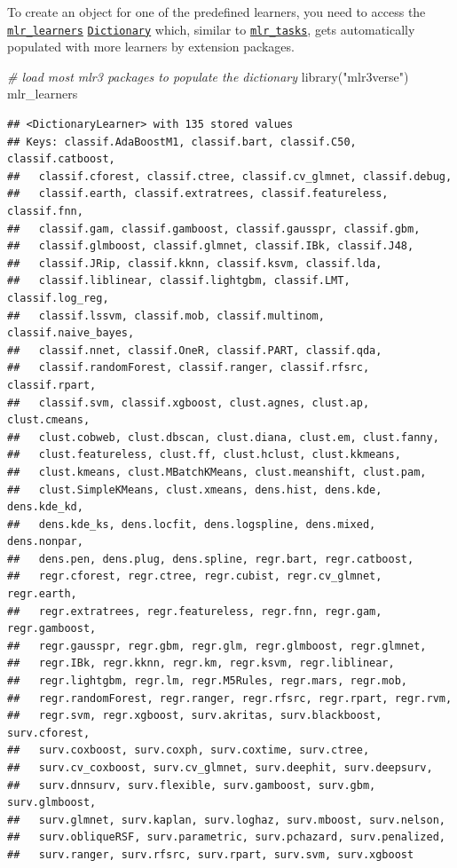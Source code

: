 \documentclass[
]{scrbook}
\newenvironment{Shaded}{\begin{snugshade}}{\end{snugshade}}
\newcommand{\CommentTok}[1]{\textcolor[rgb]{0.56,0.35,0.01}{\textit{#1}}}
\newcommand{\FunctionTok}[1]{\textcolor[rgb]{0.00,0.00,0.00}{#1}}
\newcommand{\NormalTok}[1]{#1}
\newcommand{\StringTok}[1]{\textcolor[rgb]{0.31,0.60,0.02}{#1}}
\renewenvironment{Shaded} {\begin{snugshade}\small} {\end{snugshade}}
\begin{document}
To create an object for one of the predefined learners, you need to access the \href{https://mlr3.mlr-org.com/reference/mlr_learners.html}{\texttt{mlr\_learners}} \href{https://mlr3misc.mlr-org.com/reference/Dictionary.html}{\texttt{Dictionary}} which, similar to \href{https://mlr3.mlr-org.com/reference/mlr_tasks.html}{\texttt{mlr\_tasks}}, gets automatically populated with more learners by extension packages.

\begin{Shaded}
\begin{Highlighting}[]
\CommentTok{\# load most mlr3 packages to populate the dictionary}
\FunctionTok{library}\NormalTok{(}\StringTok{"mlr3verse"}\NormalTok{)}
\NormalTok{mlr\_learners}
\end{Highlighting}
\end{Shaded}

\begin{verbatim}
## <DictionaryLearner> with 135 stored values
## Keys: classif.AdaBoostM1, classif.bart, classif.C50, classif.catboost,
##   classif.cforest, classif.ctree, classif.cv_glmnet, classif.debug,
##   classif.earth, classif.extratrees, classif.featureless, classif.fnn,
##   classif.gam, classif.gamboost, classif.gausspr, classif.gbm,
##   classif.glmboost, classif.glmnet, classif.IBk, classif.J48,
##   classif.JRip, classif.kknn, classif.ksvm, classif.lda,
##   classif.liblinear, classif.lightgbm, classif.LMT, classif.log_reg,
##   classif.lssvm, classif.mob, classif.multinom, classif.naive_bayes,
##   classif.nnet, classif.OneR, classif.PART, classif.qda,
##   classif.randomForest, classif.ranger, classif.rfsrc, classif.rpart,
##   classif.svm, classif.xgboost, clust.agnes, clust.ap, clust.cmeans,
##   clust.cobweb, clust.dbscan, clust.diana, clust.em, clust.fanny,
##   clust.featureless, clust.ff, clust.hclust, clust.kkmeans,
##   clust.kmeans, clust.MBatchKMeans, clust.meanshift, clust.pam,
##   clust.SimpleKMeans, clust.xmeans, dens.hist, dens.kde, dens.kde_kd,
##   dens.kde_ks, dens.locfit, dens.logspline, dens.mixed, dens.nonpar,
##   dens.pen, dens.plug, dens.spline, regr.bart, regr.catboost,
##   regr.cforest, regr.ctree, regr.cubist, regr.cv_glmnet, regr.earth,
##   regr.extratrees, regr.featureless, regr.fnn, regr.gam, regr.gamboost,
##   regr.gausspr, regr.gbm, regr.glm, regr.glmboost, regr.glmnet,
##   regr.IBk, regr.kknn, regr.km, regr.ksvm, regr.liblinear,
##   regr.lightgbm, regr.lm, regr.M5Rules, regr.mars, regr.mob,
##   regr.randomForest, regr.ranger, regr.rfsrc, regr.rpart, regr.rvm,
##   regr.svm, regr.xgboost, surv.akritas, surv.blackboost, surv.cforest,
##   surv.coxboost, surv.coxph, surv.coxtime, surv.ctree,
##   surv.cv_coxboost, surv.cv_glmnet, surv.deephit, surv.deepsurv,
##   surv.dnnsurv, surv.flexible, surv.gamboost, surv.gbm, surv.glmboost,
##   surv.glmnet, surv.kaplan, surv.loghaz, surv.mboost, surv.nelson,
##   surv.obliqueRSF, surv.parametric, surv.pchazard, surv.penalized,
##   surv.ranger, surv.rfsrc, surv.rpart, surv.svm, surv.xgboost
\end{verbatim}
\end{document}
